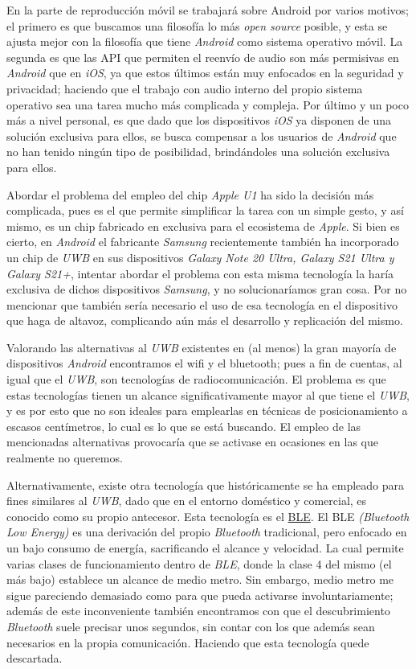 En la parte de reproducción móvil se trabajará sobre Android por varios motivos;
el primero es que buscamos una filosofía lo más \emph{open source} posible, y
esta se ajusta mejor con la filosofía que tiene \emph{Android} como sistema
operativo móvil. La segunda es que las API que permiten el reenvío de audio son
más permisivas en \emph{Android} que en \emph{iOS}, ya que estos últimos están
muy enfocados en la seguridad y privacidad; haciendo que el trabajo con audio
interno del propio sistema operativo sea una tarea mucho más complicada y
compleja. Por último y un poco más a nivel personal, es que dado que los
dispositivos \emph{iOS} ya disponen de una solución exclusiva para ellos, se
busca compensar a los usuarios de \emph{Android} que no han tenido ningún tipo
de posibilidad, brindándoles una solución exclusiva para ellos.

Abordar el problema del empleo del chip \emph{Apple U1} ha sido la decisión más
complicada, pues es el que permite simplificar la tarea con un simple gesto, y
así mismo, es un chip fabricado en exclusiva para el ecosistema de \emph{Apple}.
Si bien es cierto, en \emph{Android} el fabricante \emph{Samsung} recientemente
también ha incorporado un chip de \emph{UWB} en sus dispositivos \emph{Galaxy
Note 20 Ultra, Galaxy S21 Ultra y Galaxy S21+}, intentar abordar el problema con
esta misma tecnología la haría exclusiva de dichos dispositivos \emph{Samsung},
y no solucionaríamos gran cosa. Por no mencionar que también sería necesario el
uso de esa tecnología en el dispositivo que haga de altavoz, complicando aún más
el desarrollo y replicación del mismo.

Valorando las alternativas al \emph{UWB} existentes en (al menos) la gran
mayoría de dispositivos \emph{Android} encontramos el wifi y el bluetooth; pues
a fin de cuentas, al igual que el \emph{UWB}, son tecnologías de
radiocomunicación. El problema es que estas tecnologías tienen un alcance
significativamente mayor al que tiene el \emph{UWB}, y es por esto que no son
ideales para emplearlas en técnicas de posicionamiento a escasos centímetros, lo
cual es lo que se está buscando. El empleo de las mencionadas alternativas
provocaría que se activase en ocasiones en las que realmente no queremos.

Alternativamente, existe otra tecnología que históricamente se ha empleado para
fines similares al \emph{UWB}, dado que en el entorno doméstico y comercial, es
conocido como su propio antecesor. Esta tecnología es el
\href{https://en.wikipedia.org/wiki/Bluetooth_Low_Energy}{BLE}.
El BLE \emph{(Bluetooth Low Energy)} es una derivación del propio
\emph{Bluetooth} tradicional, pero enfocado en un bajo consumo de energía,
sacrificando el alcance y velocidad. La cual permite varias clases de
funcionamiento dentro de \emph{BLE}, donde la clase 4 del mismo (el más bajo)
establece un alcance de medio metro. Sin embargo, medio metro me sigue
pareciendo demasiado como para que pueda activarse involuntariamente; además de
este inconveniente también encontramos con que el descubrimiento
\emph{Bluetooth} suele precisar unos segundos, sin contar con los que además
sean necesarios en la propia comunicación. Haciendo que esta tecnología quede
descartada.

